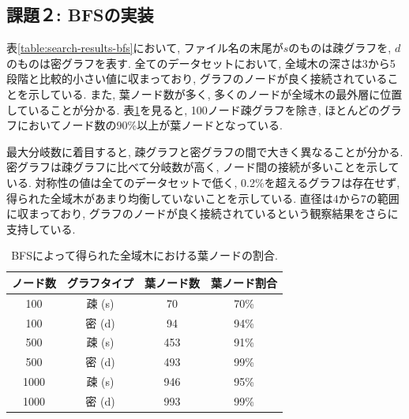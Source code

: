 \documentclass[a4j, 12pt]{jarticle}
\begin{document}
\subsection{課題２: BFSの実装}

表\ref{table:search-results-bfs}において, ファイル名の末尾が$s$のものは疎グラフを, $d$のものは密グラフを表す. 全てのデータセットにおいて, 全域木の深さは3から5段階と比較的小さい値に収まっており, グラフのノードが良く接続されていることを示している. また, 葉ノード数が多く, 多くのノードが全域木の最外層に位置していることが分かる. 表\ref{table:leaf-percentage-bfs}を見ると, 100ノード疎グラフを除き, ほとんどのグラフにおいてノード数の90\%以上が葉ノードとなっている.

\begin{table}[H]
  \centering
  \caption{BFSによる各データセットの全域木の特性}\label{table:search-results-bfs}
\end{table}

最大分岐数に着目すると, 疎グラフと密グラフの間で大きく異なることが分かる. 密グラフは疎グラフに比べて分岐数が高く, ノード間の接続が多いことを示している. 対称性の値は全てのデータセットで低く, 0.2\%を超えるグラフは存在せず, 得られた全域木があまり均衡していないことを示している. 直径は4から7の範囲に収まっており, グラフのノードが良く接続されているという観察結果をさらに支持している.
\begin{table}[h]
  \centering
  \caption{BFSによって得られた全域木における葉ノードの割合.}\label{table:leaf-percentage-bfs}
  \begin{tabular}{cccc}
  \hline
  ノード数 & グラフタイプ & 葉ノード数 & 葉ノード割合 \\
  \hline
  100   & 疎 (s)   & 70   & 70\%  \\
  100   & 密 (d)   & 94   & 94\%  \\
  500   & 疎 (s)   & 453  & 91\%  \\
  500   & 密 (d)   & 493  & 99\%  \\
  1000  & 疎 (s)   & 946  & 95\%  \\
  1000  & 密 (d)   & 993  & 99\%  \\
  \hline
  \end{tabular}
\end{table}
\end{document}

